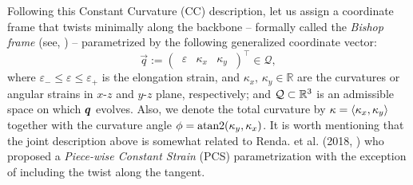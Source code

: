 %
{Following this Constant Curvature (CC) description, let us assign a coordinate frame that twists minimally along the backbone -- formally called the \emph{Bishop frame} (see, \cite{Bishop1975}) -- parametrized by the following generalized coordinate vector:}
%
\begin{equation}
\vec{q} := \begin{pmatrix}
\,\varepsilon & \kappa_x & \kappa_y\,
\end{pmatrix}^\top \in \mathcal{Q},
\label{eq:C2:coordinate}
\end{equation}
%
\noindent where $\varepsilon_{-} \le \varepsilon \le \varepsilon_{+}$ is the elongation strain, and $\kappa_x,\,\kappa_y\in\mathbb{R}$ are the curvatures or angular strains in $x$-$z$ and $y$-$z$ plane, respectively; and
$\mathcal{Q} \subset \mathbb{R}^3$ is an admissible space on which ${\boldsymbol{q}}$ evolves. Also, we denote the total curvature by $\kappa = \langle {\kappa_x}, {\kappa_y} \rangle$ together with the curvature angle $\phi = \textup{\textrm{atan2}}(\kappa_y,\kappa_x)$. It is worth mentioning that the joint description above is somewhat related to Renda. et al. (2018, \cite{Renda2018}) who proposed a \emph{Piece-wise Constant Strain} (PCS) parametrization with the exception of including the twist along the tangent.

